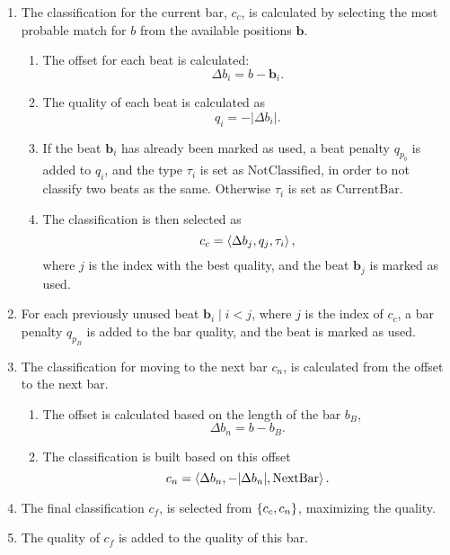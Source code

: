 \begin{enumerate}
\item The classification for the current bar, $c_c$,
is calculated by selecting the most probable match for $b$
from the available positions $\mathbf{b}$.
\begin{enumerate}
\item The offset for each beat is calculated:
\begin{equation}
\Delta b_i = b - \mathbf{b}_i.
\end{equation}

\item The quality of each beat is calculated as
\begin{equation}
q_i = -\vert \Delta b_i \vert.
\end{equation}

\item If the beat $\mathbf{b}_i$ has already been marked as used,
a beat penalty $q_{p_b}$ is added to $q_i$,
and the type $\tau_i$ is set as $\mathrm{NotClassified}$,
in order to not classify two beats as the same.
Otherwise $\tau_i$ is set as $\mathrm{CurrentBar}$.

\item The classification is then selected as
\begin{equation}
c_c = \left \langle \Delta b_j, q_j, \tau_i \right \rangle ,
\end{equation}
where $j$ is the index with the best quality,
and the beat $\mathbf{b}_j$ is marked as used.

\end{enumerate}

\item For each previously unused beat $\mathbf{b}_i \mid i < j$,
where $j$ is the index of $c_c$,
a bar penalty $q_{p_B}$ is added to the bar quality,
and the beat is marked as used.

\item The classification for moving to the next bar $c_n$,
is calculated from the offset to the next bar.
\begin{enumerate}
\item The offset is calculated based on the length of the bar $b_B$,
\begin{equation}
\Delta b_n = b - b_B.
\end{equation}

\item The classification is built based on this offset
\begin{equation}
c_n = \left \langle \Delta b_n, -\vert \Delta b_n \vert, \mathrm{NextBar} \right \rangle .
\end{equation}

\end{enumerate}

\item The final classification $c_f$,
is selected from $ \left \lbrace c_c, c_n \right \rbrace  $,
maximizing the quality.

\item The quality of $c_f$ is added to the quality of this bar.

\end{enumerate}
